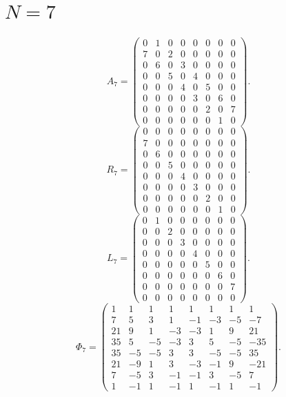 \documentclass[11pt]{amsart}
\begin{document}
\section*{$N=7$}
\[
A_{7}=\begin{pmatrix}
0 & 1 & 0 & 0 & 0 & 0 & 0 & 0 \\
7 & 0 & 2 & 0 & 0 & 0 & 0 & 0 \\
0 & 6 & 0 & 3 & 0 & 0 & 0 & 0 \\
0 & 0 & 5 & 0 & 4 & 0 & 0 & 0 \\
0 & 0 & 0 & 4 & 0 & 5 & 0 & 0 \\
0 & 0 & 0 & 0 & 3 & 0 & 6 & 0 \\
0 & 0 & 0 & 0 & 0 & 2 & 0 & 7 \\
0 & 0 & 0 & 0 & 0 & 0 & 1 & 0
\end{pmatrix}.
\]
\[
R_{7}=\begin{pmatrix}
0 & 0 & 0 & 0 & 0 & 0 & 0 & 0 \\
7 & 0 & 0 & 0 & 0 & 0 & 0 & 0 \\
0 & 6 & 0 & 0 & 0 & 0 & 0 & 0 \\
0 & 0 & 5 & 0 & 0 & 0 & 0 & 0 \\
0 & 0 & 0 & 4 & 0 & 0 & 0 & 0 \\
0 & 0 & 0 & 0 & 3 & 0 & 0 & 0 \\
0 & 0 & 0 & 0 & 0 & 2 & 0 & 0 \\
0 & 0 & 0 & 0 & 0 & 0 & 1 & 0
\end{pmatrix}.
\]
\[
L_{7}=\begin{pmatrix}
0 & 1 & 0 & 0 & 0 & 0 & 0 & 0 \\
0 & 0 & 2 & 0 & 0 & 0 & 0 & 0 \\
0 & 0 & 0 & 3 & 0 & 0 & 0 & 0 \\
0 & 0 & 0 & 0 & 4 & 0 & 0 & 0 \\
0 & 0 & 0 & 0 & 0 & 5 & 0 & 0 \\
0 & 0 & 0 & 0 & 0 & 0 & 6 & 0 \\
0 & 0 & 0 & 0 & 0 & 0 & 0 & 7 \\
0 & 0 & 0 & 0 & 0 & 0 & 0 & 0
\end{pmatrix}.
\]
\[
\Phi_{7}=\begin{pmatrix}
1 & 1 & 1 & 1 & 1 & 1 & 1 & 1 \\
7 & 5 & 3 & 1 & -1 & -3 & -5 & -7 \\
21 & 9 & 1 & -3 & -3 & 1 & 9 & 21 \\
35 & 5 & -5 & -3 & 3 & 5 & -5 & -35 \\
35 & -5 & -5 & 3 & 3 & -5 & -5 & 35 \\
21 & -9 & 1 & 3 & -3 & -1 & 9 & -21 \\
7 & -5 & 3 & -1 & -1 & 3 & -5 & 7 \\
1 & -1 & 1 & -1 & 1 & -1 & 1 & -1
\end{pmatrix}.
\]
\end{document}
